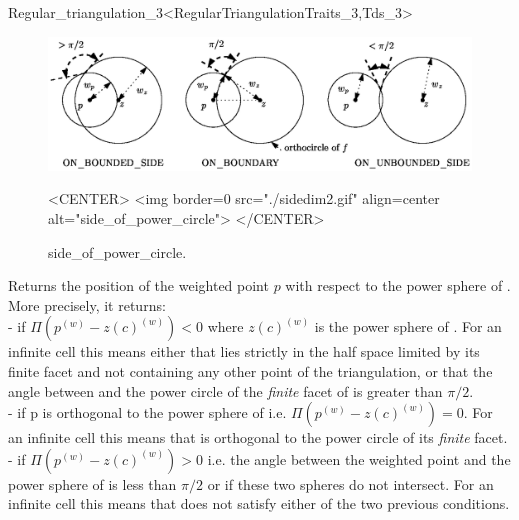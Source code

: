 \begin{ccRefClass}{Regular_triangulation_3<RegularTriangulationTraits_3,Tds_3>}
\begin{figure}[htbp]
\begin{ccTexOnly}
\begin{center} 
\includegraphics{sidedim2.eps} 
\end{center}
\end{ccTexOnly}
\caption{side\_of\_power\_circle.
\label{Triangulation3-fig-sidedim2}}
\begin{ccHtmlOnly}
<CENTER>
<img border=0 src="./sidedim2.gif" align=center
alt="side_of_power_circle"> 
</CENTER>
\end{ccHtmlOnly}
\end{figure} 

{Returns the position of the weighted point $p$ with respect to the
power sphere of . More precisely, it returns:\\
-  if $\Pi({p}^{(w)}-{z(c)}^{(w)})<0$ where
${z(c)}^{(w)}$ is the power sphere of . For an
infinite cell this means either that  lies strictly in the half
space limited by its finite facet and not containing any other point
of the triangulation, or that the angle 
between  and the power circle of the \textit{finite} facet of 
is greater than $\pi/2$. \\  
-  if p is orthogonal to the power sphere of 
i.e. $\Pi({p}^{(w)}-{z(c)}^{(w)})=0$. For an infinite cell this means
that  is orthogonal to the power circle of its \textit{finite} facet.\\ 
-  if $\Pi({p}^{(w)}-{z(c)}^{(w)})>0$
i.e. the angle between the weighted point  and the power sphere
of  is less than $\pi/2$ or if these two spheres do not
intersect. For an 
infinite cell this means that  does not satisfy either of the
two previous conditions. 
}


\end{ccRefClass}
